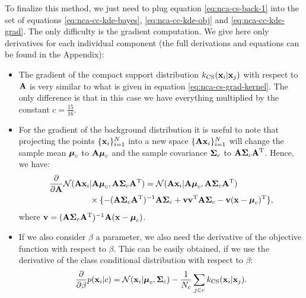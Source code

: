 	To finalize this method, we just need to plug equation \eqref{eq:nca-cs-back-1} into
	the set of equations \eqref{eq:nca-cc-kde-bayes}, \eqref{eq:nca-cc-kde-obj} and
	\eqref{eq:nca-cc-kde-grad}. The only difficulty is the gradient computation. We give here only derivatives for each individual component (the full derivations and equations can be found in the Appendix):
	\begin{itemize}
		\item The gradient of the compact support distribution $k_\text{CS}(\mathbf{x}_i|\mathbf{x}_j)$ with respect to $\mathbf{A}$ is very similar to what is given in equation \eqref{eq:nca-cs-grad-kernel}. The only difference is that in this case we have everything multiplied by the constant $c=\frac{15}{16}$.
		\item For the gradient of the background distribution it is useful to note that projecting the points $\{\mathbf{x}_i\}_{i=1}^N$
	into a new space $\{\mathbf{A}\mathbf{x}_i\}_{i=1}^N$ will change the sample mean $\mbox{\boldmath $\mu$}_c$ to
	$\mathbf{A}\mbox{\boldmath $\mu$}_c$ and the sample covariance $\mbox{\boldmath $\Sigma$}_c$ to
	$\mathbf{A}\mbox{\boldmath $\Sigma$}_c\mathbf{A}^\mathrm{T}$. Hence, we have:
		\begin{align}
			\frac{\partial}{\partial \mathbf{A}} \mathcal{N}(\mathbf{A}\mathbf{x}_i&|\mathbf{A}\mbox{\boldmath $\mu$}_c, \mathbf{A}\mbox{\boldmath $\Sigma$}_c
	\mathbf{A}^\mathrm{T}) = \mathcal{N}(\mathbf{A}\mathbf{x}_i|\mathbf{A}\mbox{\boldmath $\mu$}_c, \mathbf{A}\mbox{\boldmath $\Sigma$}_c
	\mathbf{A}^\mathrm{T})\notag\\
			&\times \{ -(\mathbf{A}\mbox{\boldmath $\Sigma$}_c \mathbf{A}^\mathrm{T})^{-1}\mathbf{A}\mbox{\boldmath $\Sigma$}_c
			+\mathbf{v} \mathbf{v} ^ \mathrm{T} \mathbf{A} \mbox{\boldmath $\Sigma$}_c - \mathbf{v} (\mathbf{x} - \mbox{\boldmath $\mu$}_c)^\mathrm{T}
			\},
		\end{align}
		where $\mathbf{v} = (\mathbf{A}\mbox{\boldmath $\Sigma$}_c \mathbf{A}^\mathrm{T})^{-1}\mathbf{A}(\mathbf{x} - \mbox{\boldmath $\mu$}_c)$.
		\item If we also consider $\beta$ a parameter, we also need the derivative of the objective function with respect to $\beta$. This can be easily obtained, if we use the derivative of the class conditional distribution with respect to $\beta$:
		\begin{align}
			\frac{\partial}{\partial\beta} p(\mathbf{x}_i|c) 
			=  \mathcal{N}(\mathbf{x}_i|\mbox{\boldmath $\mu$}_c,\mbox{\boldmath $\Sigma$}_c) -
				\frac{1}{N_c}\sum_{j\in c} k_\text{CS}(\mathbf{x}_i|\mathbf{x}_j).
		\end{align}
		
	\end{itemize}

